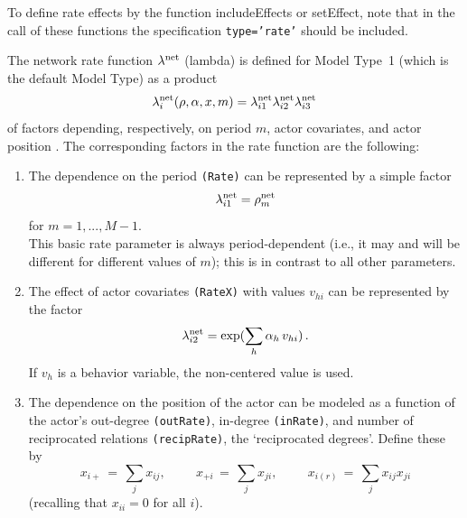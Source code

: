 \documentclass[a4paper,fleqn,11pt]{article}
\newcommand{\+}{\, + \,}
\newcommand{\sfn}[1]{\textsf{#1}}
\begin{document}
To define rate effects by the function \sfn{includeEffects} or \sfn{setEffect},
note that in the call of these functions the specification
\texttt{type='rate'} should be included.
\medskip

The network rate function $\lambda^{\rm net}$
(lambda) is defined for Model Type~1 (which is the default Model
Type) as a product \[ \lambda^{\rm net}_i(\rho, \alpha, x, m) =
\lambda^{\rm net}_{i1} \lambda^{\rm net}_{i2} \lambda^{\rm net}_{i3}
\] of factors depending, respectively, on period $m$, actor
covariates, and actor position \citep[see][p.\ 383]{Snijders01}. The
corresponding factors in the rate function are the following:
\begin{enumerate}
 \item The dependence on the period \texttt{(Rate)}
 can be represented by a simple factor
 \[ \lambda^{\rm net}_{i1} = \rho^{\rm net}_m \]
 for $m = 1, ..., M-1$.\\
 This basic rate parameter is always period-dependent (i.e.,
 it may and will be different for
 different values of $m$); this is in contrast to all other parameters.

 \item The effect of actor covariates \texttt{(RateX)} with values
 $v_{hi}$ can be represented by the factor
 \[ \lambda^{\rm net}_{i2} = \exp(\sum_h \alpha_h \, v_{hi})\,. \]
   If $v_{h}$ is a behavior variable, the non-centered value is used.

 \item The dependence on the position of the actor can be modeled
 as a function of the actor's out-degree \texttt{(outRate)},
 in-degree \texttt{(inRate)}, and number
 of reciprocated relations \texttt{(recipRate)}, the `reciprocated degrees'.
 Define these by
 \[ x_{i+} \,=\, \sum_j x_{ij}, \phantom{abcde} x_{+i} \,=\, \sum_j x_{ji},
                \phantom{abcde} x_{i(r)} \,=\, \sum_j x_{ij}x_{ji} \]
 (recalling that $x_{ii} = 0$ for all $i$).\\

\end{enumerate}
\end{document}
